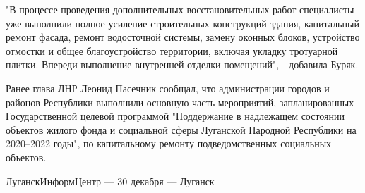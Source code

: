 "В процессе проведения дополнительных восстановительных работ специалисты уже
выполнили полное усиление строительных конструкций здания, капитальный ремонт
фасада, ремонт водосточной системы, замену оконных блоков, устройство отмостки
и общее благоустройство территории, включая укладку тротуарной плитки. Впереди
выполнение внутренней отделки помещений", - добавила Буряк.

Ранее глава ЛНР Леонид Пасечник сообщал, что администрации городов и районов
Республики выполнили основную часть мероприятий, запланированных
Государственной целевой программой "Поддержание в надлежащем состоянии объектов
жилого фонда и социальной сферы Луганской Народной Республики на 2020–2022
годы", по капитальному ремонту подведомственных социальных объектов.

ЛуганскИнформЦентр — 30 декабря — Луганск



